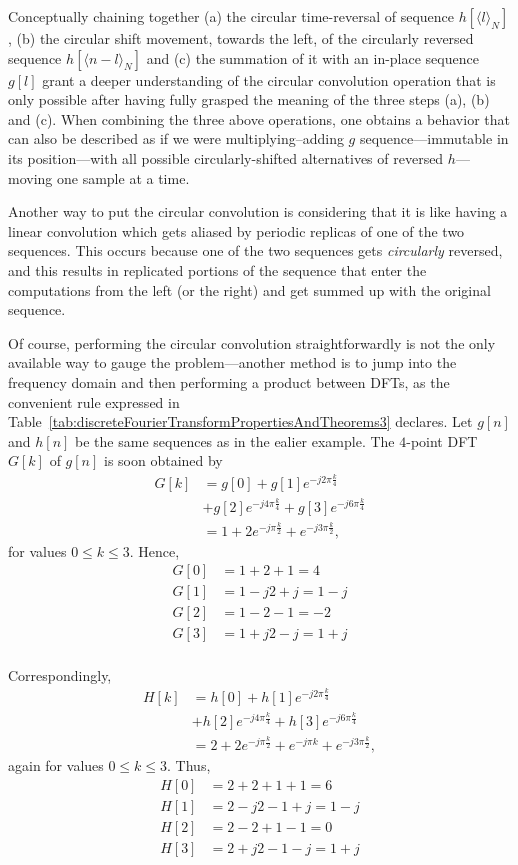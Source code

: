 \documentclass[\documentfontsize, twocolumn]{\classname}
\begin{document}
Conceptually chaining together (a) the circular time-reversal of sequence $h[\langle l\rangle_N]$, (b) the circular shift movement, towards the left, of the circularly reversed sequence $h[\langle n-l\rangle_N]$ and (c) the summation of it with an in-place sequence $g[l]$ grant a deeper understanding of the circular convolution operation that is only possible after having fully grasped the meaning of the three steps (a), (b) and (c). When combining the three above operations, one obtains a behavior that can also be described as if we were multiplying--adding $g$ sequence---immutable in its position---with all possible cir\-cu\-lar\-ly-shif\-ted alternatives of reversed $h$---moving one sample at a time.

Another way to put the circular convolution is considering that it is like having a linear convolution which gets aliased by periodic replicas of one of the two sequences. This occurs because one of the two sequences gets \emph{circularly} reversed, and this results in replicated portions of the sequence that enter the computations from the left (or the right) and get summed up with the original sequence.

Of course, performing the circular convolution straightforwardly is not the only available way to gauge the problem---another method is to jump into the frequency domain and then performing a product between DFTs, as the convenient rule expressed in Table~\ref{tab:discreteFourierTransformPropertiesAndTheorems3} declares. Let $g[n]$ and $h[n]$ be the same sequences as in the ealier example. The $4$-point DFT $G[k]$ of $g[n]$ is soon obtained by
\begin{align*}
    G[k] &= g[0] + g[1] e^{-j2\pi \frac k 4} \\
         &+ g[2]e^{-j4\pi \frac k 4} + g[3] e^{-j6\pi \frac k 4}\\
         &= 1 + 2e^{-j\pi \frac k 2} + e^{-j3\pi \frac k 2},
\end{align*}
for values $0 \leq k \leq 3$. Hence,
\begin{align*}
    G[0] &= 1 + 2 + 1 = 4\\
    G[1] &= 1 - j2 + j = 1 - j\\
    G[2] &= 1 - 2 - 1 = -2\\
    G[3] &= 1 + j2 - j = 1 + j\\
\end{align*}

Correspondingly,
\begin{align*}
    H[k] &= h[0] + h[1] e^{-j2\pi \frac k 4} \\
         &+ h[2]e^{-j4\pi \frac k 4} + h[3] e^{-j6\pi \frac k 4}\\
         &= 2 + 2e^{-j\pi \frac k 2} + e^{-j\pi k} + e^{-j3\pi \frac k 2},
\end{align*}
again for values $0 \leq k \leq 3$. Thus,
\begin{align*}
    H[0] &= 2 + 2 + 1 + 1 = 6\\
    H[1] &= 2 - j2 - 1 + j = 1 - j\\
    H[2] &= 2 - 2 + 1 - 1 = 0\\
    H[3] &= 2 + j2 - 1 - j = 1 + j\\
\end{align*}
\end{document}
